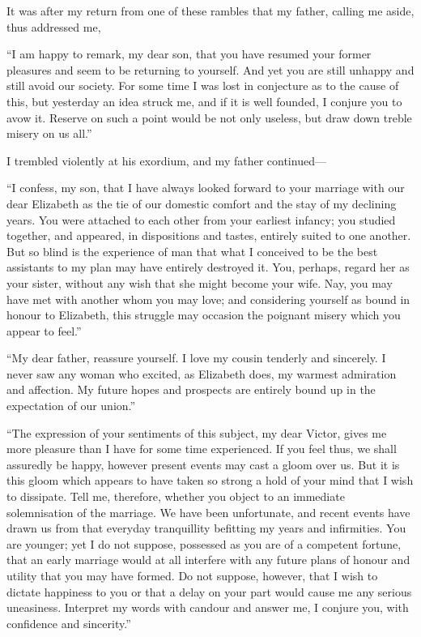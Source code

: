 \documentclass[12pt,openright]{book}
\begin{document}
It was after my return from one of these rambles that my father, calling me aside, thus addressed me,

“I am happy to remark, my dear son, that you have resumed your former pleasures and seem to be returning to yourself. And yet you are still unhappy and still avoid our society. For some time I was lost in conjecture as to the cause of this, but yesterday an idea struck me, and if it is well founded, I conjure you to avow it. Reserve on such a point would be not only useless, but draw down treble misery on us all.”

I trembled violently at his exordium, and my father continued—

“I confess, my son, that I have always looked forward to your marriage with our dear Elizabeth as the tie of our domestic comfort and the stay of my declining years. You were attached to each other from your earliest infancy; you studied together, and appeared, in dispositions and tastes, entirely suited to one another. But so blind is the experience of man that what I conceived to be the best assistants to my plan may have entirely destroyed it. You, perhaps, regard her as your sister, without any wish that she might become your wife. Nay, you may have met with another whom you may love; and considering yourself as bound in honour to Elizabeth, this struggle may occasion the poignant misery which you appear to feel.”

“My dear father, reassure yourself. I love my cousin tenderly and sincerely. I never saw any woman who excited, as Elizabeth does, my warmest admiration and affection. My future hopes and prospects are entirely bound up in the expectation of our union.”

“The expression of your sentiments of this subject, my dear Victor, gives me more pleasure than I have for some time experienced. If you feel thus, we shall assuredly be happy, however present events may cast a gloom over us. But it is this gloom which appears to have taken so strong a hold of your mind that I wish to dissipate. Tell me, therefore, whether you object to an immediate solemnisation of the marriage. We have been unfortunate, and recent events have drawn us from that everyday tranquillity befitting my years and infirmities. You are younger; yet I do not suppose, possessed as you are of a competent fortune, that an early marriage would at all interfere with any future plans of honour and utility that you may have formed. Do not suppose, however, that I wish to dictate happiness to you or that a delay on your part would cause me any serious uneasiness. Interpret my words with candour and answer me, I conjure you, with confidence and sincerity.”
\end{document}
